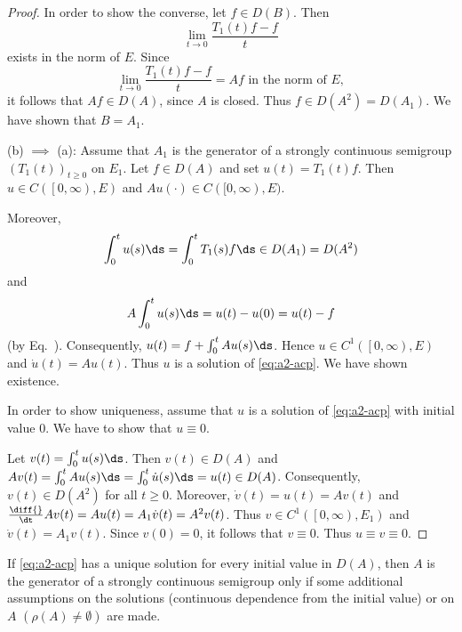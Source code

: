 \begin{proof}
In order to show the converse, let $f \in D(B)$.
Then 
\[ 
\lim_{t \to 0} \frac{T_{1}(t)f - f}{t}
\]
exists in the norm of\/ $E$.
Since  
\[ 
\lim_{t \to 0} \frac{T_{1}(t)f - f}{t} = Af \text{ in the norm of } E,
\]
it follows that $Af \in D(A)$, since $A$ is closed.
Thus $f \in D(A^{2}) = D(A_{1})$.
We have shown that $B = A_{1}$.

(b)  $\implies$ (a):  
Assume that $A_{1}$ is the generator of a strongly continuous semigroup $(T_{1}(t))_{t \geq 0}$ on $E_{1}$.
Let $f \in D(A)$ and set $u(t) = T_{1}(t)f$.
Then $u \in C(\left[0,\infty\right),E)$ and $Au(\cdot) \in C([0,\infty),E)$.

Moreover, 
\[
\int_{0}^{t} u(s) \ds = \int_{0}^{t} T_{1}(s) f   \ds \in D(A_{1}) = D(A^{2})
\]
and 
\[
A\int_{0}^{t} u(s) \ds = u(t) - u(0) = u(t) - f
\]
(by Eq.~).
Consequently, $u(t) = f + \int_{0}^{t} Au(s) \ds$.
Hence $u \in C^{1}(\left[0,\infty  \right),E)$ and $\dot{u}(t) = Au(t)$.
Thus $u$ is a solution of \eqref{eq:a2-acp}.
We have shown existence.

In order to show uniqueness, assume that $u$ is a solution of \eqref{eq:a2-acp} with initial value $0$.
We have to show that $u \equiv 0$.

Let $v(t) = \int_{0}^{t} u(s) \ds$.
Then $v(t) \in D(A)$ and $Av(t) = \int_{0}^{t} Au(s) \ds =
 \int_{0}^{t} \dot{u}(s) \ds = 
 u(t) \in D(A)$.
Consequently, $v(t) \in D(A^{2})$ for all $t \geq 0$.
Moreover, $\dot{v}(t) = u(t) = Av(t)$ and 
$\frac{\diff{}}{\dt}Av(t) = Au(t) = A_{1}\dot{v}(t) = A^{2}v(t)$.
Thus $v \in C^{1}(\left[0,\infty \right),E_{1})$ and $\dot{v}(t) = A_{1}v(t)$.
Since $v(0) = 0$, it follows that $v \equiv 0$.
Thus $u \equiv v  \equiv 0$.
\end{proof}
If \eqref{eq:a2-acp} has a unique solution for every initial value in $D(A)$, then $A$ is the generator of a strongly continuous semigroup only if some additional assumptions on the solutions (continuous dependence from the initial value) or on $A$ $(\rho(A) \neq \emptyset)$ are made.
